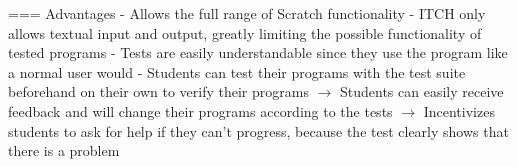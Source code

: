 === Advantages
- Allows the full range of Scratch functionality
    - ITCH only allows textual input and output, greatly limiting the possible functionality of tested programs
- Tests are easily understandable since they use the program like a normal user would
    - Students can test their programs with the test suite beforehand on their own to verify their programs
        $\rightarrow$ Students can easily receive feedback and will change their programs according to the tests
        $\rightarrow$ Incentivizes students to ask for help if they can't progress, because the test clearly shows that there is a problem
